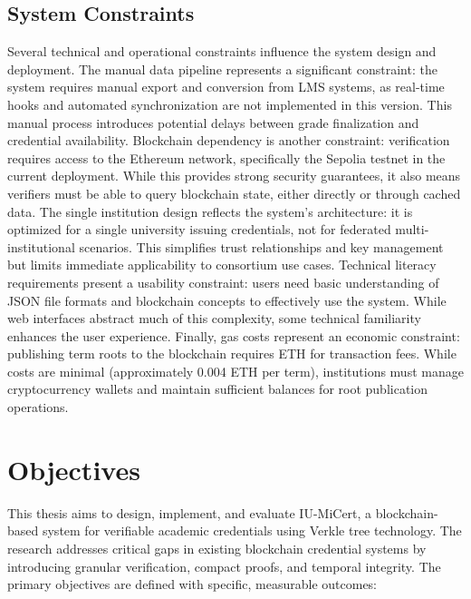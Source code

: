 \subsection{System Constraints}
Several technical and operational constraints influence the system design and deployment. The manual data pipeline represents a significant constraint: the system requires manual export and conversion from LMS systems, as real-time hooks and automated synchronization are not implemented in this version. This manual process introduces potential delays between grade finalization and credential availability. Blockchain dependency is another constraint: verification requires access to the Ethereum network, specifically the Sepolia testnet in the current deployment. While this provides strong security guarantees, it also means verifiers must be able to query blockchain state, either directly or through cached data. The single institution design reflects the system's architecture: it is optimized for a single university issuing credentials, not for federated multi-institutional scenarios. This simplifies trust relationships and key management but limits immediate applicability to consortium use cases. Technical literacy requirements present a usability constraint: users need basic understanding of JSON file formats and blockchain concepts to effectively use the system. While web interfaces abstract much of this complexity, some technical familiarity enhances the user experience. Finally, gas costs represent an economic constraint: publishing term roots to the blockchain requires ETH for transaction fees. While costs are minimal (approximately 0.004 ETH per term), institutions must manage cryptocurrency wallets and maintain sufficient balances for root publication operations.

\section{Objectives}
This thesis aims to design, implement, and evaluate IU-MiCert, a blockchain-based system for verifiable academic credentials using Verkle tree technology. The research addresses critical gaps in existing blockchain credential systems by introducing granular verification, compact proofs, and temporal integrity. The primary objectives are defined with specific, measurable outcomes:

